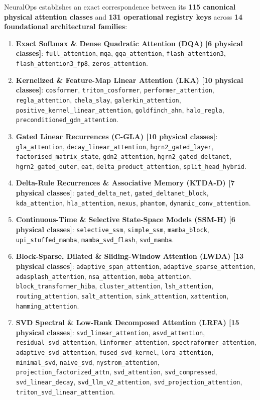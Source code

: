 \documentclass{article}
\begin{document}
NeuralOps establishes an exact correspondence between its \textbf{115 canonical physical attention classes} and \textbf{131 operational registry keys} across \textbf{14 foundational architectural families}:
\begin{enumerate}
    \item \textbf{Exact Softmax \& Dense Quadratic Attention (DQA) [6 physical classes]}: \texttt{full\_attention}, \texttt{mqa}, \texttt{gqa\_attention}, \texttt{flash\_attention3}, \texttt{flash\_attention3\_fp8}, \texttt{zeros\_attention}.
    \item \textbf{Kernelized \& Feature-Map Linear Attention (LKA) [10 physical classes]}: \texttt{cosformer}, \texttt{triton\_cosformer}, \texttt{performer\_attention}, \texttt{regla\_attention}, \texttt{chela\_slay}, \texttt{galerkin\_attention}, \texttt{positive\_kernel\_linear\_attention}, \texttt{goldfinch\_ahn}, \texttt{halo\_regla}, \texttt{preconditioned\_gdn\_attention}.
    \item \textbf{Gated Linear Recurrences (C-GLA) [10 physical classes]}: \texttt{gla\_attention}, \texttt{decay\_linear\_attention}, \texttt{hgrn2\_gated\_layer}, \texttt{factorised\_matrix\_state}, \texttt{gdn2\_attention}, \texttt{hgrn2\_gated\_deltanet}, \texttt{hgrn2\_gated\_outer}, \texttt{eat}, \texttt{delta\_product\_attention}, \texttt{split\_head\_hybrid}.
    \item \textbf{Delta-Rule Recurrences \& Associative Memory (KTDA-D) [7 physical classes]}: \texttt{gated\_delta\_net}, \texttt{gated\_deltanet\_block}, \texttt{kda\_attention}, \texttt{hla\_attention}, \texttt{nexus}, \texttt{phantom}, \texttt{dynamic\_conv\_attention}.
    \item \textbf{Continuous-Time \& Selective State-Space Models (SSM-H) [6 physical classes]}: \texttt{selective\_ssm}, \texttt{simple\_ssm}, \texttt{mamba\_block}, \texttt{upi\_stuffed\_mamba}, \texttt{mamba\_svd\_flash}, \texttt{svd\_mamba}.
    \item \textbf{Block-Sparse, Dilated \& Sliding-Window Attention (LWDA) [13 physical classes]}: \texttt{adaptive\_span\_attention}, \texttt{adaptive\_sparse\_attention}, \texttt{adasplash\_attention}, \texttt{nsa\_attention}, \texttt{moba\_attention}, \texttt{block\_transformer\_hiba}, \texttt{cluster\_attention}, \texttt{lsh\_attention}, \texttt{routing\_attention}, \texttt{salt\_attention}, \texttt{sink\_attention}, \texttt{xattention}, \texttt{hamming\_attention}.
    \item \textbf{SVD Spectral \& Low-Rank Decomposed Attention (LRFA) [15 physical classes]}: \texttt{svd\_linear\_attention}, \texttt{asvd\_attention}, \texttt{residual\_svd\_attention}, \texttt{linformer\_attention}, \texttt{spectraformer\_attention}, \texttt{adaptive\_svd\_attention}, \texttt{fused\_svd\_kernel}, \texttt{lora\_attention}, \texttt{minimal\_svd}, \texttt{naive\_svd}, \texttt{nystrom\_attention}, \texttt{projection\_factorized\_attn}, \texttt{svd\_attention}, \texttt{svd\_compressed}, \texttt{svd\_linear\_decay}, \texttt{svd\_llm\_v2\_attention}, \texttt{svd\_projection\_attention}, \texttt{triton\_svd\_linear\_attention}.

\end{enumerate}
\end{document}
